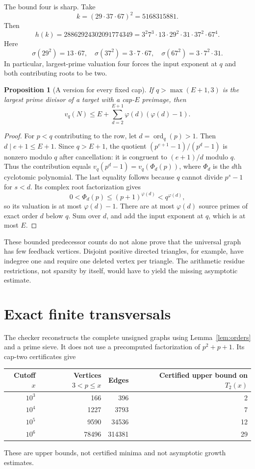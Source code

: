 \documentclass[11pt]{article}
\newtheorem{proposition}[theorem]{Proposition}
\DeclareMathOperator{\ord}{ord}
\begin{document}
The bound four is sharp. Take
\[
 k=(29\cdot37\cdot67)^2=5168315881.
\]
Then
\[
 h(k)=28862924302091774349
 =3^2 7^3\cdot13\cdot29^2\cdot31\cdot37^2\cdot67^4.
\]
Here
\[
 \sigma(29^2)=13\cdot67,\quad
 \sigma(37^2)=3\cdot7\cdot67,\quad
 \sigma(67^2)=3\cdot7^2\cdot31.
\]
In particular, largest-prime valuation four forces the input exponent at $q$ and both contributing roots to be two.

\begin{proposition}[A version for every fixed cap]
If $q>\max(E+1,3)$ is the largest prime divisor of a target with a cap-$E$ preimage, then
\[
 v_q(N)\le E+\sum_{d=2}^{E+1}\varphi(d)(\varphi(d)-1).
\]
\end{proposition}
\begin{proof}
For $p<q$ contributing to the row, let $d=\ord_q(p)>1$. Then $d\mid e+1\le E+1$. Since $q>E+1$, the quotient $(p^{e+1}-1)/(p^d-1)$ is nonzero modulo $q$ after cancellation: it is congruent to $(e+1)/d$ modulo $q$. Thus the contribution equals $v_q(p^d-1)=v_q(\Phi_d(p))$, where $\Phi_d$ is the $d$th cyclotomic polynomial. The last equality follows because $q$ cannot divide $p^s-1$ for $s<d$. Its complex root factorization gives
\[
 0<\Phi_d(p)\le(p+1)^{\varphi(d)}<q^{\varphi(d)},
\]
so its valuation is at most $\varphi(d)-1$. There are at most $\varphi(d)$ source primes of exact order $d$ below $q$. Sum over $d$, and add the input exponent at $q$, which is at most $E$.
\end{proof}

These bounded predecessor counts do not alone prove that the universal graph has few feedback vertices. Disjoint positive directed triangles, for example, have indegree one and require one deleted vertex per triangle. The arithmetic residue restrictions, not sparsity by itself, would have to yield the missing asymptotic estimate.

\section{Exact finite transversals}
The checker reconstructs the complete unsigned graphs using Lemma~\ref{lem:orders} and a prime sieve. It does not use a precomputed factorization of $p^2+p+1$. Its cap-two certificates give
\begin{center}
\begin{tabular}{@{}rrrr@{}}
\toprule
Cutoff $x$ & Vertices $3<p\le x$ & Edges & Certified upper bound on $T_2(x)$\\
\midrule
$10^3$ & 166 & 396 & 2\\
$10^4$ & 1227 & 3793 & 7\\
$10^5$ & 9590 & 34536 & 12\\
$10^6$ & 78496 & 314381 & 29\\
\bottomrule
\end{tabular}
\end{center}
These are upper bounds, not certified minima and not asymptotic growth estimates.
\end{document}
